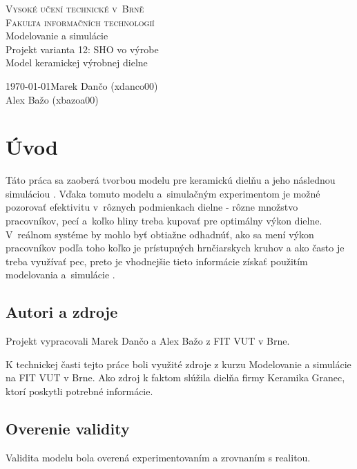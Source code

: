 \documentclass[11pt,a4paper]{article}
\begin{document}
\begin{titlepage}
\begin{center}
	\thispagestyle{empty}
	\textsc{\Huge Vysoké učení technické v~Brně\\[0.4em]
			\huge Fakulta informačních technologií}\\
	{\LARGE
	Modelovanie a simulácie \\[0.4em]
    Projekt varianta 12: SHO vo výrobe\\[0.4em]
	\Huge 
	Model keramickej výrobnej dielne \\[0.4em]
    }
\end{center}
    
\LARGE \today \hfill Marek Dančo (xdanco00)\\\hphantom{1} \hfill{Alex Bažo (xbazoa00)}
\end{titlepage}	

\section{Úvod}
Táto práca sa zaoberá tvorbou modelu \cite[7. strana]{IMS_slides} pre keramickú dielňu \cite{Keramika_Granec} a jeho následnou simuláciou \cite[33. strana]{IMS_slides}. Vďaka tomuto modelu a~simulačným experimentom \cite[9. strana]{IMS_slides} je možné pozorovať efektivitu v~rôznych podmienkach dielne - rôzne množstvo pracovníkov, pecí a~koľko hliny treba kupovať pre optimálny výkon dielne. V~reálnom systéme \cite[19. strana]{IMS_slides} by mohlo byť obtiažne odhadnúť, ako sa mení výkon pracovníkov podľa toho koľko je prístupných hrnčiarskych kruhov a ako často je treba využívať pec, preto je vhodnejšie tieto informácie získať použitím modelovania a~simulácie \cite[(. strana]{IMS_slides}.

\subsection{Autori a zdroje}
Projekt vypracovali Marek Dančo a Alex Bažo z FIT VUT v Brne.

K technickej časti tejto práce boli využité zdroje z kurzu Modelovanie a simulácie na FIT VUT v Brne.
Ako zdroj k faktom slúžila dielňa firmy Keramika Granec, ktorí poskytli potrebné informácie.

\subsection{Overenie validity}
Validita modelu \cite[37. strana]{IMS_slides} bola overená experimentovaním a zrovnaním s realitou.
\end{document}
